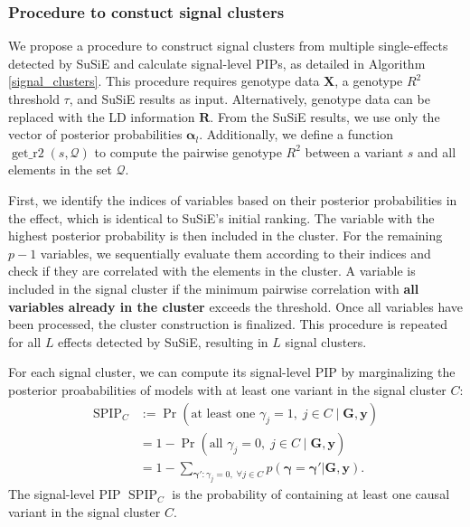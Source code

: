 \documentclass[pdflatex,sn-mathphys-num]{sn-jnl}%
\theoremstyle{thmstyleone}%
\theoremstyle{thmstyletwo}%
\theoremstyle{thmstylethree}%
\begin{document}
\subsubsection{Procedure to constuct signal clusters}
We propose a procedure to construct signal clusters from multiple single-effects detected by SuSiE and calculate signal-level PIPs, as detailed in Algorithm \ref{signal_clusters}. This procedure requires genotype data $\mathbf{X}$, a genotype $R^2$ threshold $\tau$, and SuSiE results as input. Alternatively, genotype data can be replaced with the LD information $\mathbf{R}$. From the SuSiE results, we use only the vector of posterior probabilities $\boldsymbol{\alpha}_l$. Additionally, we define a function $\operatorname{get\_r2}\left(s,\mathcal{Q}\right)$ to compute the pairwise genotype $R^2$ between a variant $s$ and all elements in the set $\mathcal{Q}$.

First, we identify the indices of variables based on their posterior probabilities in the effect, which is identical to SuSiE's initial ranking. The variable with the highest posterior probability is then included in the cluster. For the remaining $p-1$ variables, we sequentially evaluate them according to their indices and check if they are correlated with the elements in the cluster. A variable is included in the signal cluster if the minimum pairwise correlation with \textbf{all variables already in the cluster} exceeds the threshold. Once all variables have been processed, the cluster construction is finalized. This procedure is repeated for all $L$ effects detected by SuSiE, resulting in $L$ signal clusters.

For each signal cluster, we can compute its signal-level PIP by marginalizing the posterior proababilities of models with at least one variant in the signal cluster $C$:
\begin{align}
    \operatorname{SPIP}_{C} &:= \operatorname{Pr}\left(\text{at least one }\gamma_j=1, \; j \in C \mid \mathbf{G},\mathbf{y}\right) \\
    &= 1 - \operatorname{Pr}\left(\text{all }\gamma_j=0,\; j \in C \mid \mathbf{G},\mathbf{y}\right) \\
    &= 1 - \sum_{\boldsymbol{\gamma}':\gamma_{j} = 0, \; \forall j \in C} p(\boldsymbol{\gamma}=\boldsymbol{\gamma}'|\mathbf{G},\mathbf{y}).
\end{align}
The signal-level PIP $\operatorname{SPIP}_{C}$ is the probability of containing at least one causal variant in the signal cluster $C$.
    
\end{document}
